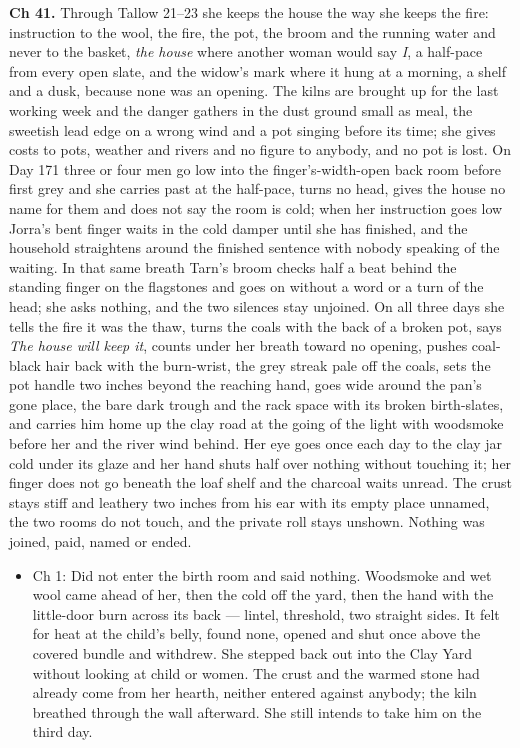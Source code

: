\documentclass{design/chronicle}
\begin{document}
{\textbf{Ch 41.} Through Tallow 21–23 she keeps the house the way she keeps the fire: instruction to the wool, the fire, the pot, the broom and the running water and never to the basket, \emph{the house} where another woman would say \emph{I}, a half-pace from every open slate, and the widow’s mark where it hung at a morning, a shelf and a dusk, because none was an opening. The kilns are brought up for the last working week and the danger gathers in the dust ground small as meal, the sweetish lead edge on a wrong wind and a pot singing before its time; she gives costs to pots, weather and rivers and no figure to anybody, and no pot is lost. On Day 171 three or four men go low into the finger’s-width-open back room before first grey and she carries past at the half-pace, turns no head, gives the house no name for them and does not say the room is cold; when her instruction goes low Jorra’s bent finger waits in the cold damper until she has finished, and the household straightens around the finished sentence with nobody speaking of the waiting. In that same breath Tarn’s broom checks half a beat behind the standing finger on the flagstones and goes on without a word or a turn of the head; she asks nothing, and the two silences stay unjoined. On all three days she tells the fire it was the thaw, turns the coals with the back of a broken pot, says \emph{The house will keep it}, counts under her breath toward no opening, pushes coal-black hair back with the burn-wrist, the grey streak pale off the coals, sets the pot handle two inches beyond the reaching hand, goes wide around the pan’s gone place, the bare dark trough and the rack space with its broken birth-slates, and carries him home up the clay road at the going of the light with woodsmoke before her and the river wind behind. Her eye goes once each day to the clay jar cold under its glaze and her hand shuts half over nothing without touching it; her finger does not go beneath the loaf shelf and the charcoal waits unread. The crust stays stiff and leathery two inches from his ear with its empty place unnamed, the two rooms do not touch, and the private roll stays unshown. Nothing was joined, paid, named or ended.

\begin{itemize}[leftmargin=1.4em,itemsep=1pt,topsep=3pt,parsep=0pt]

\item Ch 1: Did not enter the birth room and said nothing. Woodsmoke and wet wool came ahead of her, then the cold off the yard, then the hand with the little-door burn across its back --- lintel, threshold, two straight sides. It felt for heat at the child’s belly, found none, opened and shut once above the covered bundle and withdrew. She stepped back out into the Clay Yard without looking at child or women. The crust and the warmed stone had already come from her hearth, neither entered against anybody; the kiln breathed through the wall afterward. She still intends to take him on the third day.


\end{itemize}}
\end{document}
